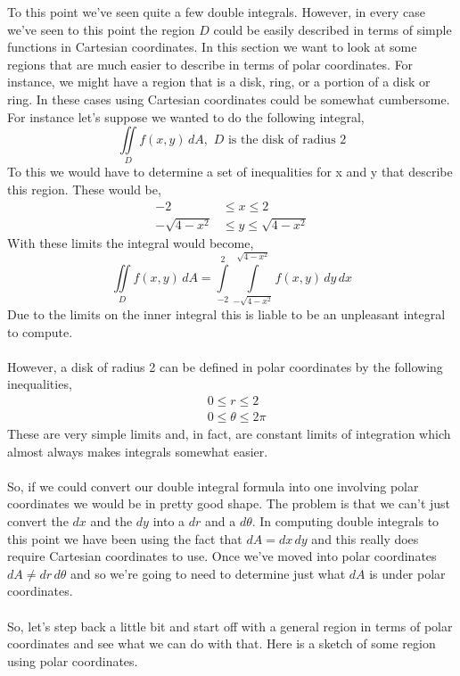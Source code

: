 \documentclass[10pt,reqno]{book}
\theoremstyle{definition}
\begin{document}
	To this point we've seen quite a few double integrals. However, in every case we've seen to this point the region $ D $ could be easily described in terms of simple functions in Cartesian coordinates. In this section we want to look at some regions that are much easier to describe in terms of polar coordinates. For instance, we might have a region that is a disk, ring, or a portion of a disk or ring. In these cases using Cartesian coordinates could be somewhat cumbersome. For instance let's suppose we wanted to do the following integral,
	\[ \iint\limits_D f(x,y)\,dA,\,\, D \text{ is the disk of radius } 2 \]
	To this we would have to determine a set of inequalities for x and y that describe this region.  These would be, 
	\begin{align*}
		-2 &\leq x \leq 2\\
		-\sqrt{4 - x^2} &\leq y \leq \sqrt{4 - x^2}
	\end{align*}
	With these limits the integral would become,
	\[ \iint\limits_D f(x,y)\,dA = \int\limits_{-2}^{2} \int\limits_{-\sqrt{4 - x^2}}^{\sqrt{4 - x^2}} f(x,y)\,dy\,dx \]
	Due to the limits on the inner integral this is liable to be an unpleasant integral to compute.\\ \\
	However, a disk of radius 2 can be defined in polar coordinates by the following inequalities,
	\begin{align*}
		& 0 \leq r \leq 2\\
		& 0 \leq \theta \leq 2\pi
	\end{align*}
	These are very simple limits and, in fact, are constant limits of integration which almost always makes integrals somewhat easier.\\ \\
	So, if we could convert our double integral formula into one involving polar coordinates we would be in pretty good shape. The problem is that we can't just convert the $ dx $ and the $ dy $ into a $ dr $ and a $ d\theta $.  In computing double integrals to this point we have been using the fact that $ dA = dx\,dy $ and this really does require Cartesian coordinates to use. Once we've moved into polar coordinates $ dA \neq dr\,d\theta $ and so we're going to need to determine just what $ dA $ is under polar coordinates.\\ \\
	So, let's step back a little bit and start off with a general region in terms of polar coordinates and see what we can do with that. Here is a sketch of some region using polar coordinates.
\end{document}
